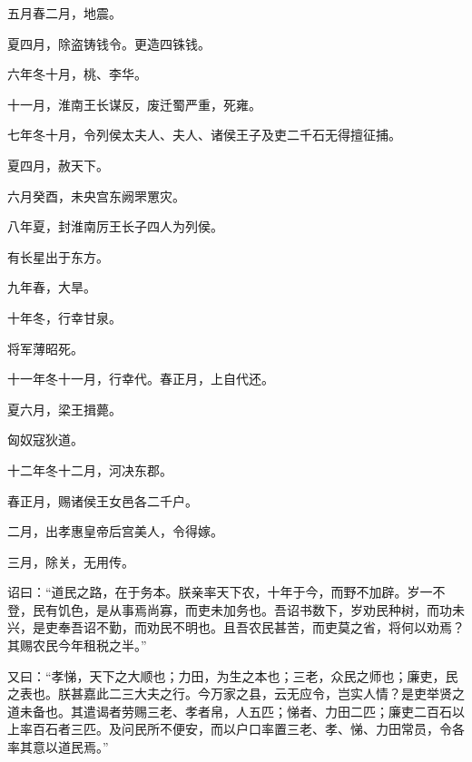 \documentclass[12pt,UTF8]{ctexbook}
\begin{document}
五月春二月，地震。



夏四月，除盗铸钱令。更造四铢钱。



六年冬十月，桃、李华。



十一月，淮南王长谋反，废迁蜀严重，死雍。



七年冬十月，令列侯太夫人、夫人、诸侯王子及吏二千石无得擅征捕。



夏四月，赦天下。



六月癸酉，未央宫东阙罘罳灾。



八年夏，封淮南厉王长子四人为列侯。



有长星出于东方。



九年春，大旱。



十年冬，行幸甘泉。



将军薄昭死。



十一年冬十一月，行幸代。春正月，上自代还。



夏六月，梁王揖薨。



匈奴寇狄道。



十二年冬十二月，河决东郡。



春正月，赐诸侯王女邑各二千户。



二月，出孝惠皇帝后宫美人，令得嫁。



三月，除关，无用传。



诏曰：“道民之路，在于务本。朕亲率天下农，十年于今，而野不加辟。岁一不登，民有饥色，是从事焉尚寡，而吏未加务也。吾诏书数下，岁劝民种树，而功未兴，是吏奉吾诏不勤，而劝民不明也。且吾农民甚苦，而吏莫之省，将何以劝焉？其赐农民今年租税之半。”



又曰：“孝悌，天下之大顺也；力田，为生之本也；三老，众民之师也；廉吏，民之表也。朕甚嘉此二三大夫之行。今万家之县，云无应令，岂实人情？是吏举贤之道未备也。其遣谒者劳赐三老、孝者帛，人五匹；悌者、力田二匹；廉吏二百石以上率百石者三匹。及问民所不便安，而以户口率置三老、孝、悌、力田常员，令各率其意以道民焉。”
\end{document}
